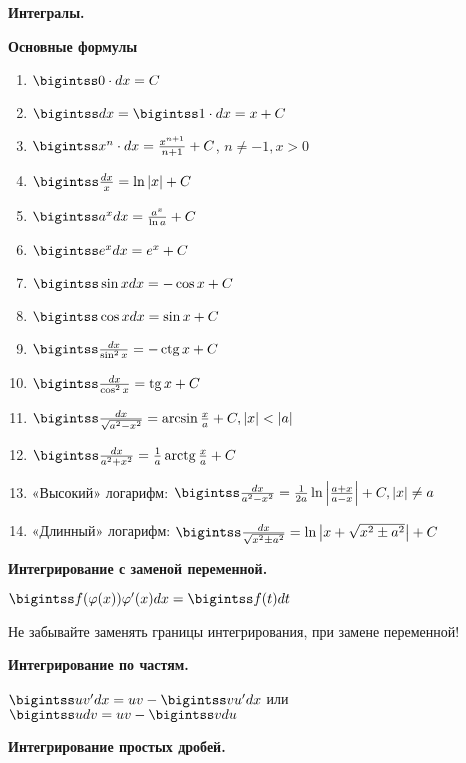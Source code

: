 {\large\textbf{Интегралы.}}


\textbf{Основные формулы} 

\begin{enumerate}

  \item $\bigintss 0 \cdot d x=C$
  \item $\bigintss d x=\bigintss 1 \cdot d x=x+C$
  \item $\bigintss x^{n} \cdot d x=\frac{x^{n+1}}{n+1}+C$, $n \neq-1, x>0$
  \item $\bigintss \frac{d x}{x}=\ln |x|+C$
  \item $\bigintss a^{x} d x=\frac{a^{x}}{\ln a}+C$
  \item $\bigintss e^{x} d x=e^{x}+C$
  \item $\bigintss \sin x d x=-\cos x+C$
  \item $\bigintss \cos x d x=\sin x+C$

  \item $\bigintss \frac{d x}{\sin ^{2} x}=-\operatorname{ctg} x+C$
  \item $\bigintss \frac{d x}{\cos ^{2} x}=\operatorname{tg} x+C$
  \item $\bigintss \frac{d x}{\sqrt{a^{2}-x^{2}}}=\arcsin \frac{x}{a}+C,|x|<|a|$
  \item $\bigintss \frac{d x}{a^{2}+x^{2}}=\frac{1}{a} \operatorname{arctg} \frac{x}{a}+C$
  \item «Высокий» логарифм:
    $\bigintss \frac{d x}{a^{2}-x^{2}}=\frac{1}{2 a} \ln \left|\frac{a+x}{a-x}\right|+C,|x| \neq a$
  \item «Длинный» логарифм:
    $\bigintss \frac{d x}{\sqrt{x^{2} \pm a^{2}}}=\ln \left|x+\sqrt{x^{2} \pm a^{2}}\right|+C$

\end{enumerate}

\textbf{Интегрирование с заменой переменной.} 

$\bigintss f(\varphi(x))\varphi'(x)dx=\bigintss f(t)dt$

Не забывайте заменять границы интегрирования, при замене переменной!

\textbf{Интегрирование по частям.} 

$\bigintss uv'dx = uv - \bigintss vu'dx$ или $\bigintss udv = uv - \bigintss vdu$

\textbf{Интегрирование простых дробей.} 

